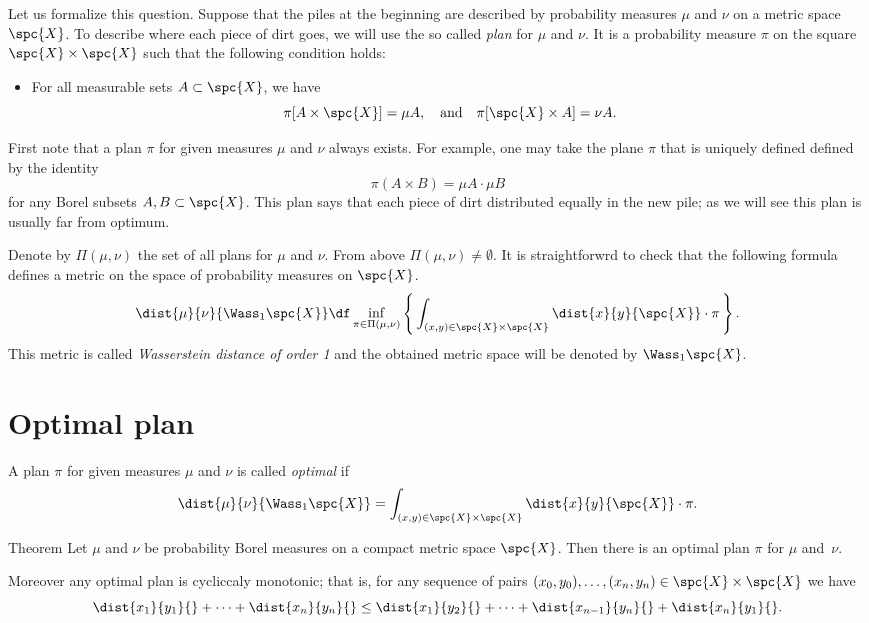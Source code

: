 Let us formalize this question.
Suppose that the piles at the beginning are described by probability measures $\mu$ and $\nu$ on a metric space~$\spc{X}$.
To describe where each piece of dirt goes, we will use the so called \emph{plan} for $\mu$ and $\nu$.
It is a probability measure $\pi$ on the square $\spc{X}\times\spc{X}$ such that the following condition holds:
\begin{itemize}
\item For all measurable sets $A \subset \spc{X}$, we have 
\[\pi [A \times \spc{X}] = \mu A,\quad\text{and}\quad \pi [  \spc{X}\times A] = \nu A.\]
\end{itemize}

First note that a plan $\pi$ for given measures $\mu$ and $\nu$ always exists.
For example, one may take the plane $\pi$ that is uniquely defined  defined by the identity
\[\pi(A\times B)=\mu A\cdot \mu B\]
for any Borel subsets $A,B\subset\spc{X}$.
This plan says that each piece of dirt distributed equally in the new pile; as we will see this plan is usually far from optimum.

Denote by $\Pi(\mu,\nu)$ the set of all plans for $\mu$ and $\nu$.
From above $\Pi(\mu,\nu)\ne\emptyset$.
It is straightforwrd to check that the following formula defines a metric on the space of probability measures on $\spc{X}$.
\[\dist{\mu}{\nu}{\Wass_1\spc{X}}
\df
\inf_{\pi\in\Pi(\mu,\nu)}
\left\{\,\int_{(x,y)\in\spc{X}\times\spc{X}}\dist{x}{y}{\spc{X}}\cdot\pi\,\right\}.\]
This metric is called \emph{Wasserstein distance of order 1} and the obtained metric space will be denoted by $\Wass_1\spc{X}$.

\section{Optimal plan}

A plan $\pi$ for given measures $\mu$ and $\nu$ is called \emph{optimal} if 
\[\dist{\mu}{\nu}{\Wass_1\spc{X}}
=\int_{(x,y)\in\spc{X}\times\spc{X}}\dist{x}{y}{\spc{X}}\cdot\pi.\]

\begin{thm}{Theorem}
Let $\mu$ and $\nu$ be probability Borel measures on a compact metric space $\spc{X}$.
Then there is an optimal plan $\pi$ for $\mu$ and~$\nu$.

Moreover any optimal plan is cycliccaly monotonic;
that is, for any sequence of pairs $(x_0,y_0),\dots,(x_n,y_n)\in\spc{X}\times\spc{X}$ we have
\[\dist{x_1}{y_1}{}+\dots+\dist{x_n}{y_n}{}
\le
\dist{x_1}{y_2}{}+\dots+\dist{x_{n-1}}{y_n}{}+\dist{x_{n}}{y_1}{}.\]
\end{thm}


